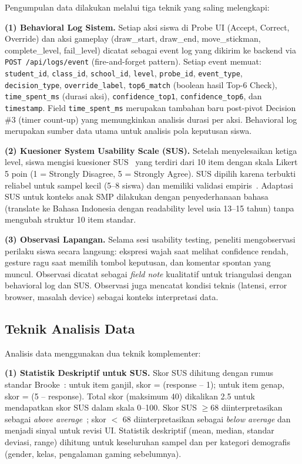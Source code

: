 \documentclass[12pt,a4paper,oneside,openany]{report}
\begin{document}
Pengumpulan data dilakukan melalui tiga teknik yang saling melengkapi:

\textbf{(1) Behavioral Log Sistem.} Setiap aksi siswa di Probe UI (Accept, Correct, Override) dan aksi gameplay (draw\_start, draw\_end, move\_stickman, complete\_level, fail\_level) dicatat sebagai event log yang dikirim ke backend via \texttt{POST /api/logs/event} (fire-and-forget pattern). Setiap event memuat: \texttt{student\_id}, \texttt{class\_id}, \texttt{school\_id}, \texttt{level}, \texttt{probe\_id}, \texttt{event\_type}, \texttt{decision\_type}, \texttt{override\_label}, \texttt{top6\_match} (boolean hasil Top-6 Check), \texttt{time\_spent\_ms} (durasi aksi), \texttt{confidence\_top1}, \texttt{confidence\_top6}, dan \texttt{timestamp}. Field \texttt{time\_spent\_ms} merupakan tambahan baru post-pivot Decision \#3 (timer count-up) yang memungkinkan analisis durasi per aksi. Behavioral log merupakan sumber data utama untuk analisis pola keputusan siswa.

\textbf{(2) Kuesioner System Usability Scale (SUS).} Setelah menyelesaikan ketiga level, siswa mengisi kuesioner SUS~\cite{ref15}\cite{ref16} yang terdiri dari 10 item dengan skala Likert 5 poin (1 = Strongly Disagree, 5 = Strongly Agree). SUS dipilih karena terbukti reliabel untuk sampel kecil (5--8 siswa) dan memiliki validasi empiris~\cite{ref16}. Adaptasi SUS untuk konteks anak SMP dilakukan dengan penyederhanaan bahasa (translate ke Bahasa Indonesia dengan readability level usia 13--15 tahun) tanpa mengubah struktur 10 item standar.

\textbf{(3) Observasi Lapangan.} Selama sesi usability testing, peneliti mengobservasi perilaku siswa secara langsung: ekspresi wajah saat melihat confidence rendah, gesture ragu saat memilih tombol keputusan, dan komentar spontan yang muncul. Observasi dicatat sebagai \textit{field note} kualitatif untuk triangulasi dengan behavioral log dan SUS. Observasi juga mencatat kondisi teknis (latensi, error browser, masalah device) sebagai konteks interpretasi data.

\subsection{Teknik Analisis Data}
\label{subsec:teknik-analisis-data}

Analisis data menggunakan dua teknik komplementer:

\textbf{(1) Statistik Deskriptif untuk SUS.} Skor SUS dihitung dengan rumus standar Brooke~\cite{ref15}: untuk item ganjil, skor = (response -- 1); untuk item genap, skor = (5 -- response). Total skor (maksimum 40) dikalikan 2.5 untuk mendapatkan skor SUS dalam skala 0--100. Skor SUS $\geq 68$ diinterpretasikan sebagai \textit{above average}~\cite{ref16}; skor $<$ 68 diinterpretasikan sebagai \textit{below average} dan menjadi sinyal untuk revisi UI. Statistik deskriptif (mean, median, standar deviasi, range) dihitung untuk keseluruhan sampel dan per kategori demografis (gender, kelas, pengalaman gaming sebelumnya).
\end{document}
